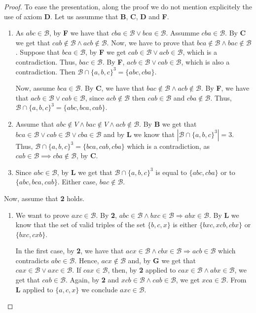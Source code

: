 \documentclass{article}
\newcommand{\calb}{\mathcal{B}}
\begin{document}
\begin{proof}
	To ease the presentation, along the proof we do not mention explicitely the use of axiom \textbf{D}. Let us assumme that \textbf{B}, \textbf{C}, \textbf{D} and \textbf{F}. 

	\begin{enumerate}
		\item[\textbf{L}\,] As $abc\in\calb$, by \textbf{F} we have that $cba\in\calb\lor bca\in\calb$. Assumme $cba\in\calb$.   By \textbf{C} we get that $cab\notin\calb\land acb\notin\calb$. Now, we have to prove that $ bca\notin\calb\land bac\notin\calb$. Suppose that $bca\in\calb$, by \textbf{F} we get $cab\in\calb\lor acb\in\calb$, which is a contradiction. Thus, $bac\in\calb$.   By \textbf{F}, $acb\in\calb\lor cab\in\calb$, which is also a contradiction. Then  $ \calb\cap \{a,b,c\}^3=\{abc,cba\}$.
	
		Now, assume $bca\in\calb$.   By \textbf{C}, we have that $ bac\notin\calb\land acb\notin\calb$.   By \textbf{F}, we have that $acb\in\calb\lor cab\in\calb$, since $acb\notin\calb$ then $cab\in\calb$ and $ cba\notin\calb$. Thus, $ \calb\cap\{a,b,c\}^3=\{abc,bca,cab\}$.
        
		\item[\textbf{G}\,] Assume that $ abc\notin V \land bac\notin V\land acb\notin\calb$.   By $\textbf{B}$ we get that $bca\in\calb\lor cab\in\calb\lor cba\in\calb$ and by \textbf{L} we know that $| \calb\cap \{a,b,c\}^3|=3$. Thus, $ \calb\cap \{a,b,c\}^3=\{bca,cab,cba\}$ which is a contradiction, as $cab\in\calb\implies cba\notin\calb$, by \textbf{C}.
	 
		\item[\textbf{C'}\,] Since $abc\in\calb$, by \textbf{L}  we get that $ \calb\cap \{a,b,c\}^3$ is equal to  $\{abc,cba\}$ or to $\{abc,bca,cab\}$. Either case, $bac\notin\calb$.
        	\end{enumerate}

	Now, assume that \textbf{2} holds.
	\begin{enumerate}
		\item[\textbf{3}\,] We want to prove $axc\in\calb$.   By \textbf{2}, $abc\in\calb\land bxc\in\calb\Rightarrow abx\in\calb$.  By \textbf{L} we know that the set of valid triples of the set $\{b,c,x\}$ is either $\{bxc,xcb,cbx\}$ or $\{bxc,cxb\}$. %
	
		In the first case, by \textbf{2}, we have that $acx\in\calb\land cbx\in\calb \Rightarrow acb\in\calb$ which contradicts $abc\in\calb$. Hence, $acx\notin\calb$ and, by \textbf{G} we get that $cax\in\calb\lor axc\in\calb$. If $cax\in\calb$, then, by \textbf{2} applied to $cax\in\calb\land abx\in\calb$, we get that $cab\in\calb$. Again, by \textbf{2} and $xcb\in\calb\land cab\in\calb$, we get $xca\in\calb$. From \textbf{L} applied to $\{a,c,x\}$ we conclude $axc\in\calb$. 
	

\end{enumerate}
\end{proof}
\end{document}
